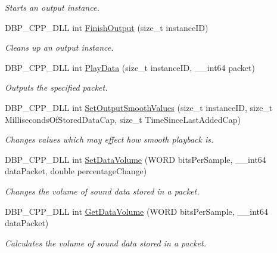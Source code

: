 \begin{DoxyCompactItemize}
\begin{DoxyCompactList}\small\item\em Starts an output instance. \item\end{DoxyCompactList}\item 
DBP\_\-CPP\_\-DLL int \hyperlink{namespacemn_sound_aca0eaf06306a5523bb15d7bb5787fb70}{FinishOutput} (size\_\-t instanceID)
\begin{DoxyCompactList}\small\item\em Cleans up an output instance. \item\end{DoxyCompactList}\item 
DBP\_\-CPP\_\-DLL int \hyperlink{namespacemn_sound_aab142da544befb73ad95ecebaad53ee5}{PlayData} (size\_\-t instanceID, \_\-\_\-int64 packet)
\begin{DoxyCompactList}\small\item\em Outputs the specified packet. \item\end{DoxyCompactList}\item 
DBP\_\-CPP\_\-DLL int \hyperlink{namespacemn_sound_afe40d7ee00b58513c992e79f11bab4ae}{SetOutputSmoothValues} (size\_\-t instanceID, size\_\-t MillisecondsOfStoredDataCap, size\_\-t TimeSinceLastAddedCap)
\begin{DoxyCompactList}\small\item\em Changes values which may effect how smooth playback is. \item\end{DoxyCompactList}\item 
DBP\_\-CPP\_\-DLL int \hyperlink{namespacemn_sound_a3238359791aa5c4e673f34a33c78f77b}{SetDataVolume} (WORD bitsPerSample, \_\-\_\-int64 dataPacket, double percentageChange)
\begin{DoxyCompactList}\small\item\em Changes the volume of sound data stored in a packet. \item\end{DoxyCompactList}\item 
DBP\_\-CPP\_\-DLL int \hyperlink{namespacemn_sound_ab78e930fc31f2c31b41582efcdbcfc92}{GetDataVolume} (WORD bitsPerSample, \_\-\_\-int64 dataPacket)
\begin{DoxyCompactList}\small\item\em Calculates the volume of sound data stored in a packet. \item\end{DoxyCompactList}\item 

\end{DoxyCompactItemize}
